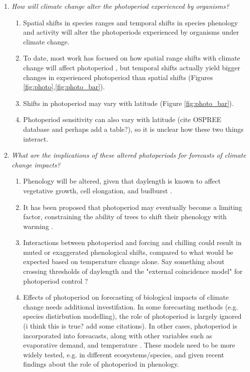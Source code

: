 \documentclass{article}
\begin{document}
\begin{enumerate}
\item\textit{How will climate change alter the photoperiod experienced by organisms?}
\begin{enumerate}
\item Spatial shifts in species ranges and temporal shifts in species phenology and activity will alter the photoperiods experienced by organisms under climate change.
\item  To date, most work has focused on how spatial range shifts with climate change will affect photoperiod \citep{saikkonen2012}, but temporal shifts actually yield bigger changes in experienced photoperiod than spatial shifts  (Figures \ref{fig:photo},\ref{fig:photo_bar}).
\item Shifts in photoperiod may vary with latitude (Figure \ref{fig:photo_bar}). 
\item Photoperiod sensitivity can also vary with latitude (cite OSPREE database and perhaps add a table?), so it is unclear how these two things interact.
\end{enumerate}
\item\textit{What are the implications of these altered photoperiods for forecasts of climate change impacts?}
\begin{enumerate}
\item Phenology will be altered, given that daylength is known to affect vegetative growth, cell elongation, and budburst \citep{linkosalo2006,erwin1998,sidaway2010, hsu2011}.
\item It has been proposed that photoperiod may eventually become a limiting factor, constraining the ability of trees to shift their phenology with warming \citep{koerner2010,vitasse2013, morin2010}. 
\item Interactions between photoperiod and forcing and chilling could result in muted or exaggerated phenological shifts, compared to what would be expected based on temperature change alone. Say something about crossing thresholds of daylength and the "external coincidence model" for photoperiod control \citep{bastow2002,kobayashi2007,andres2012,singh2017}?
\item Effects of photoperiod on forecasting of biological impacts of climate change needs additional investifation. In some forecasting methods (e.g. species distirbution modelling), the role of photoperiod is largely ignored (i think this is true? add some citations). In other cases, photoperiod is incorporated into foreacasts, along with other variables such as evaporative demand, and temperature \citep [e.g. ED] []{jolly2005, medvigy2013}. These models need to be more widely tested, e.g. in different ecosystems/species, and given recent findings about the role of photoperiod in phenology.     

\end{enumerate}
\end{enumerate}
\end{document}
